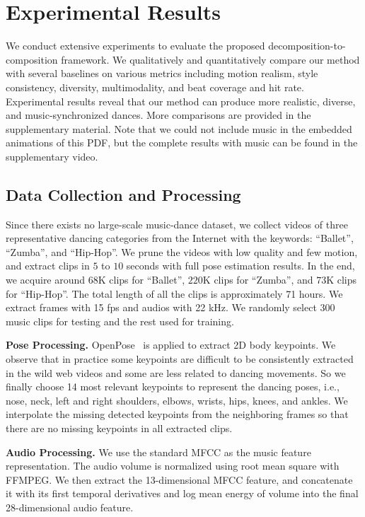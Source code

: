 \documentclass{article}
\newlength\secmargin
\begin{document}
\section{Experimental Results}
\label{sec:experiment}
\vspace{\secmargin}
We conduct extensive experiments to evaluate the proposed decomposition-to-composition framework.
We qualitatively and quantitatively compare our method with several baselines on various metrics including motion realism, style consistency, diversity, multimodality, and beat coverage and hit rate. 
Experimental results reveal that our method can produce more realistic, diverse, and music-synchronized dances. 
More comparisons are provided in the supplementary material. 
Note that we could not include music in the embedded animations of this PDF, but the complete results with music can be found in the supplementary video.  

\subsection{Data Collection and Processing}
\label{subsec:data}
Since there exists no large-scale music-dance dataset, we collect videos of three representative dancing categories from the Internet with the keywords: ``Ballet'', ``Zumba'', and ``Hip-Hop''.
We prune the videos with low quality and few motion, and extract clips in $5$ to $10$ seconds with full pose estimation results.
In the end, we acquire around $68$K clips for ``Ballet'', $220$K clips for ``Zumba'', and $73$K clips for ``Hip-Hop''.
The total length of all the clips is approximately 71 hours.
We extract frames with 15 fps and audios with 22 kHz. 
We randomly select $300$ music clips for testing and the rest used for training. 

\textbf{Pose Processing.} OpenPose~\cite{cao2017realtime} is applied to extract 2D body keypoints.
We observe that in practice some keypoints are difficult to be consistently extracted in the wild web videos and some are less related to dancing movements.
So we finally choose 14 most relevant keypoints to represent the dancing poses, i.e., nose, neck, left and right shoulders, elbows, wrists, hips, knees, and ankles.
We interpolate the missing detected keypoints from the neighboring frames so that there are no missing keypoints in all extracted clips.

\textbf{Audio Processing.} We use the standard MFCC as the music feature representation.
The audio volume is normalized using root mean square with FFMPEG. We then extract the 13-dimensional MFCC feature, and concatenate it with its first temporal derivatives and log mean energy of volume into the final 28-dimensional audio feature. 
\end{document}
